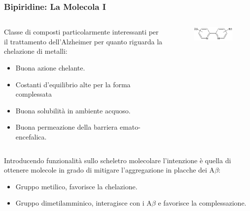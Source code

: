 \documentclass[9pt]{beamer}
\begin{document}
\begin{frame}
	\frametitle{Bipiridine: La Molecola I}
	\begin{columns}
		\begin{column}{.6\textwidth}
			Classe di composti particolarmente interessanti per il trattamento dell'Alzheimer per quanto riguarda la chelazione di metalli:
			\begin{itemize}
				\item Buona azione chelante.
				\item Costanti d'equilibrio alte per la forma complessata
				\item Buona solubilità in ambiente acquoso.
				\item Buona permeazione della barriera emato-encefalica.
			\end{itemize}
		\end{column}
		\begin{column}{.4\textwidth}
			\begin{figure}
				\includegraphics[width=\textwidth]{immagini/bpy.png}
			\end{figure}
		\end{column}
	\end{columns}
	\bigskip
	Introducendo funzionalità sullo scheletro molecolare l'intenzione è quella di ottenere molecole in grado di mitigare l'aggregazione in placche dei A$\beta$:
	\begin{itemize}
		\item Gruppo metilico, favorisce la chelazione.
		\item Gruppo dimetilamminico, interagisce con i A$\beta$ e favorisce la complessazione.
	\end{itemize}
\end{frame}
\end{document}
